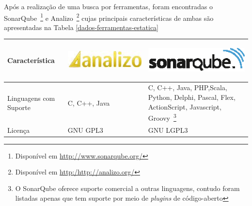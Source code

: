 Após a realização de uma busca por ferramentas, foram encontradas o SonarQube~\footnote{Disponível em \url{http://www.sonarqube.org/}} e Analizo~\footnote{Disponível em \url{http:/http://analizo.org/}} cujas principais características de ambas são apresentadas na Tabela \ref{dados-ferramentas-estatica}
\begin{savenotes}
\begin{table}[!ht]
\centering
\begin{tabular}{|p{5cm}|p{4.5cm}|p{5cm}|}
\hline

Característica 

&

\begin{center}
\includegraphics[keepaspectratio=false,scale=0.48]{figuras/analizo.eps} 
\end{center}


&



\begin{center}
\includegraphics[keepaspectratio=false,scale=0.48]{figuras/sonarqube.eps} 
\end{center}





   
\\ \hline


Linguagens com Suporte  & C, C++, Java & C, C++, Java, PHP,Scala, Python, Delphi, Pascal, Flex, ActionScript, Javascript, Groovy~\footnote{O SonarQube oferece suporte comercial a outras linguagens, contudo foram listadas apenas que tem suporte por meio de \textit{plugins} de código-aberto} \\ \hline
Licença  & GNU GPL3 & GNU LGPL3  \\ \hline




\end{tabular}
\end{table}
\end{savenotes}
